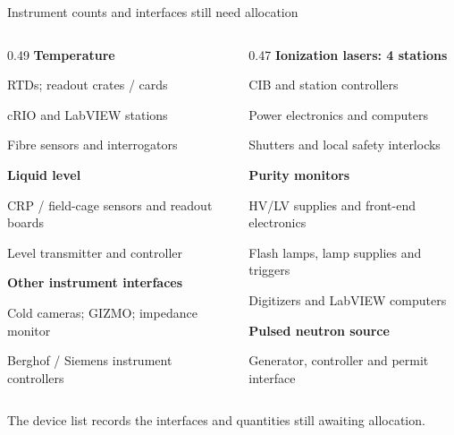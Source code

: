 \begin{frame}{Instrument counts and interfaces still need allocation}
\small
\begin{columns}[T,onlytextwidth]
\begin{column}{0.49\textwidth}
\textbf{Temperature}\par
\hspace*{0.8em}RTDs; readout crates / cards\par
\hspace*{0.8em}cRIO and LabVIEW stations\par
\hspace*{0.8em}Fibre sensors and interrogators\par\medskip
\textbf{Liquid level}\par
\hspace*{0.8em}CRP / field-cage sensors and readout boards\par
\hspace*{0.8em}Level transmitter and controller\par\medskip
\textbf{Other instrument interfaces}\par
\hspace*{0.8em}Cold cameras; GIZMO; impedance monitor\par
\hspace*{0.8em}Berghof / Siemens instrument controllers
\end{column}
\begin{column}{0.47\textwidth}
\textbf{Ionization lasers: 4 stations}\par
\hspace*{0.8em}CIB and station controllers\par
\hspace*{0.8em}Power electronics and computers\par
\hspace*{0.8em}Shutters and local safety interlocks\par\medskip
\textbf{Purity monitors}\par
\hspace*{0.8em}HV/LV supplies and front-end electronics\par
\hspace*{0.8em}Flash lamps, lamp supplies and triggers\par
\hspace*{0.8em}Digitizers and LabVIEW computers\par\medskip
\textbf{Pulsed neutron source}\par
\hspace*{0.8em}Generator, controller and permit interface
\end{column}
\end{columns}\par\bigskip
The device list records the interfaces and quantities still awaiting allocation.
\end{frame}
